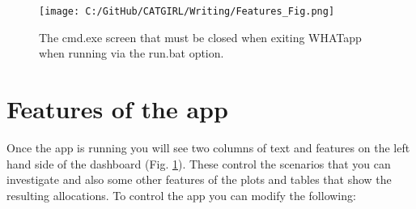 \documentclass[11pt]{article}
\begin{document}
 \begin{figure} [h]
  \centering
\texttt{[image: C:/GitHub/CATGIRL/Writing/Features\_Fig.png]}
  \caption {The cmd.exe screen that must be closed when exiting WHATapp when running via the run.bat option.}
  \label{fig:featpg}
\end{figure}




\section{Features of the app}
Once the app is running you will see two columns of text and features on the left hand side of the dashboard (Fig. \ref{fig:featpg}). These control the scenarios that you can investigate and also some other features of the plots and tables that show the resulting allocations. To control the app you can modify the following:
\end{document}
